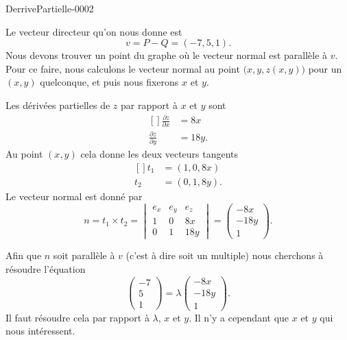 
\begin{corrige}{DerrivePartielle-0002}

	Le vecteur directeur qu'on nous donne est 
	\begin{equation}
		v=P-Q=(-7,5,1).
	\end{equation}
	Nous devons trouver un point du graphe où le vecteur normal est parallèle à $v$. Pour ce faire, nous calculons le vecteur normal au point $\big( x,y,z(x,y) \big)$ pour un $(x,y)$ quelconque, et puis nous fixerons $x$ et $y$.

	Les dérivées partielles de $z$ par rapport à $x$ et $y$ sont
	\begin{equation}
		\begin{aligned}[]
			\frac{ \partial z }{ \partial x }&=8x\\
			\frac{ \partial z }{ \partial y }&=18y.
		\end{aligned}
	\end{equation}
	Au point $(x,y)$ cela donne les deux vecteurs tangents 
	\begin{equation}
		\begin{aligned}[]
			t_1&=(1,0,8x)\\
			t_2&=(0,1,8y).
		\end{aligned}
	\end{equation}
	Le vecteur normal est donné par
	\begin{equation}
		n=t_1\times t_2=\begin{vmatrix}
			e_x	&	e_y	&	e_z	\\
			1	&	0	&	8x	\\
			0	&	1	&	18y
		\end{vmatrix}=\begin{pmatrix}
			-8x	\\ 
			-18y	\\ 
			1	
		\end{pmatrix}.
	\end{equation}
	
	Afin que $n$ soit parallèle à $v$ (c'est à dire soit un multiple) nous cherchons à résoudre l'équation
	\begin{equation}
		\begin{pmatrix}
			-7	\\ 
			5	\\ 
			1	
		\end{pmatrix}=\lambda
		\begin{pmatrix}
			-8x	\\ 
			-18y	\\ 
			1	
		\end{pmatrix}.
	\end{equation}
	Il faut résoudre cela par rapport à $\lambda$, $x$ et $y$. Il n'y a cependant que $x$ et $y$ qui nous intéressent.


\end{corrige}
